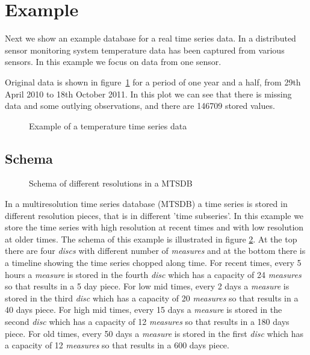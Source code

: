 \section{Example}

Next we show an example database for a real time series data.  In a
distributed sensor monitoring system temperature data has been
captured from various sensors. In this example we focus on data from
one sensor.  

Original data is shown in figure~\ref{fig:exemple:original} for a
period of one year and a half, from 29th April 2010 to 18th October
2011. In this plot we can see that there is missing data and some
outlying observations, and there are 146709 stored values.



\begin{figure}[tp]
  \centering
  \scriptsize
  
  \caption{Example of a temperature time series data}
  \label{fig:exemple:original}
\end{figure}



\subsection{Schema}

\begin{figure}[tp]
\centering

\caption{Schema of different resolutions in a MTSDB}
\label{fig:exemple:window}
\end{figure}


In a multiresolution time series database (MTSDB) a time series is
stored in different resolution pieces, that is in different 'time
subseries'.  In this example we store the time series with high
resolution at recent times and with low resolution at older times. The
schema of this example is illustrated in figure
\ref{fig:exemple:window}. At the top there are four \emph{discs} with
different number of \emph{measures} and at the bottom there is a
timeline showing the time series chopped along time. For recent times,
every 5 hours a \emph{measure} is stored in the fourth \emph{disc}
which has a capacity of 24 \emph{measures} so that results in a 5 day
piece. For low mid times, every 2 days a \emph{measure} is stored in
the third \emph{disc} which has a capacity of 20 \emph{measures} so
that results in a 40 days piece. For high mid times, every 15 days a
\emph{measure} is stored in the second \emph{disc} which has a
capacity of 12 \emph{measures} so that results in a 180 days
piece. For old times, every 50 days a \emph{measure} is stored in the
first \emph{disc} which has a capacity of 12 \emph{measures} so that
results in a 600 days piece.



